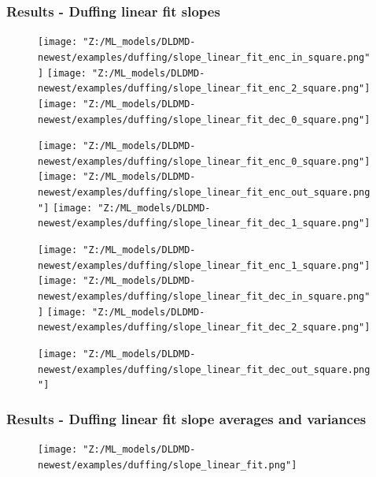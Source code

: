 \documentclass[11pt,aspectratio=169]{beamer}
\begin{document}
    \begin{frame}
        \frametitle{Results - Duffing linear fit slopes}
        \begin{figure}
            \centering
            \begin{minipage}{.3333\textwidth}
                \texttt{[image: "Z:/ML\_models/DLDMD-newest/examples/duffing/slope\_linear\_fit\_enc\_in\_square.png"]}
                \texttt{[image: "Z:/ML\_models/DLDMD-newest/examples/duffing/slope\_linear\_fit\_enc\_2\_square.png"]}
                \texttt{[image: "Z:/ML\_models/DLDMD-newest/examples/duffing/slope\_linear\_fit\_dec\_0\_square.png"]}
            \end{minipage}%
            \begin{minipage}{.3333\textwidth}
                \texttt{[image: "Z:/ML\_models/DLDMD-newest/examples/duffing/slope\_linear\_fit\_enc\_0\_square.png"]}
                \texttt{[image: "Z:/ML\_models/DLDMD-newest/examples/duffing/slope\_linear\_fit\_enc\_out\_square.png"]}
                \texttt{[image: "Z:/ML\_models/DLDMD-newest/examples/duffing/slope\_linear\_fit\_dec\_1\_square.png"]}
            \end{minipage}%
            \begin{minipage}{.3333\textwidth}
                \texttt{[image: "Z:/ML\_models/DLDMD-newest/examples/duffing/slope\_linear\_fit\_enc\_1\_square.png"]}
                \texttt{[image: "Z:/ML\_models/DLDMD-newest/examples/duffing/slope\_linear\_fit\_dec\_in\_square.png"]}
                \texttt{[image: "Z:/ML\_models/DLDMD-newest/examples/duffing/slope\_linear\_fit\_dec\_2\_square.png"]}
            \end{minipage}
            \texttt{[image: "Z:/ML\_models/DLDMD-newest/examples/duffing/slope\_linear\_fit\_dec\_out\_square.png"]}
        \end{figure}
    \end{frame}

    \begin{frame}
        \frametitle{Results - Duffing linear fit slope averages and variances}
        \begin{figure}
            \centering
            \texttt{[image: "Z:/ML\_models/DLDMD-newest/examples/duffing/slope\_linear\_fit.png"]}
        \end{figure}
    \end{frame}

\end{document}
